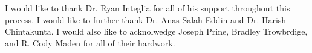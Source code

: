 \documentclass[
11pt, %
english, %
singlespacing, %
headsepline, %
]{MastersDoctoralThesis} %
\begin{document}

\begin{acknowledgements}
\addchaptertocentry{\acknowledgementname} %

I would like to thank Dr. Ryan Integlia for all of his support throughout this process. I would like to further thank Dr. Anas Salah Eddin and Dr. Harish Chintakunta. I would also like to acknolwedge Joseph Prine, Bradley Trowbrdige, and  R. Cody Maden for all of their hardwork. 

\end{acknowledgements}


\tableofcontents %

\listoffigures %

\listoftables %

\end{document}
